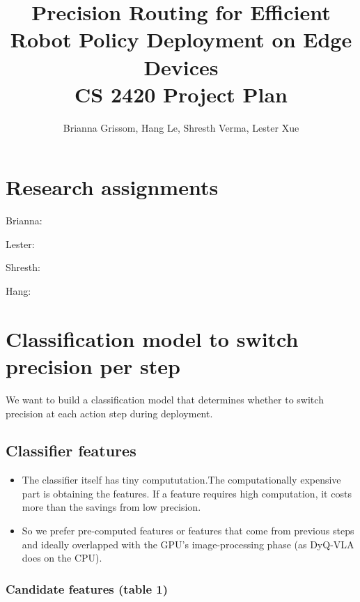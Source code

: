 \documentclass[11pt]{article}
\title{Precision Routing for Efficient Robot Policy Deployment on Edge Devices\\
\large CS 2420 Project Plan}
\author{Brianna Grissom, Hang Le, Shresth Verma, Lester Xue}
\begin{document}
\maketitle

\section*{Research assignments}

\noindent
Brianna:

\noindent
Lester:

\noindent
Shresth:

\noindent
Hang:




\section*{Classification model to switch precision per step}\label{classification-model-to-switch-precision-per-step}

We want to build a classification model that determines whether to switch precision at each action step during deployment.

\subsection{Classifier features}\label{classifier-features}

\begin{itemize}
\item The classifier itself has tiny compututation.The computationally expensive part is obtaining the features. If a feature requires high computation, it costs more than the savings from low precision.
\item So we prefer pre-computed features or features that come from previous steps and ideally overlapped with the GPU's image-processing phase (as DyQ-VLA does on the CPU).
\end{itemize}

\subsubsection{Candidate features (table 1)}\label{candidate-features}
\end{document}
